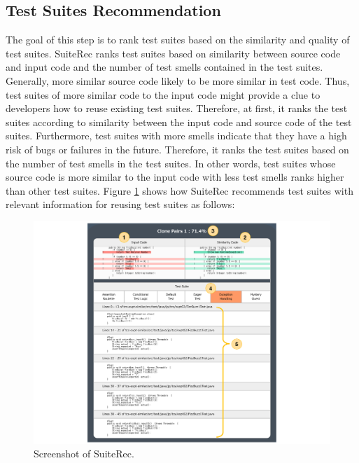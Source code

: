 \documentclass[conference]{IEEEtran}
\begin{document}
\subsection{Test Suites Recommendation}
The goal of this step is to rank test suites based on the similarity and quality of test suites. \textsf{SuiteRec} ranks test suites based on similarity between source code and input code and the number of test smells contained in the test suites. 
Generally, more similar source code likely to be more similar in test code. Thus, test suites of more similar code to the input code might provide a clue to developers how to reuse existing test suites. Therefore, at first, it ranks the test suites according to similarity between the input code and source code of the test suites. Furthermore, test suites with more smells indicate that they have a high risk of bugs or failures in the future. Therefore, it ranks the test suites based on the number of test smells in the test suites. In other words, test suites whose source code is more similar to the input code with less test smells ranks higher than other test suites. 
Figure \ref{fig:screen} shows how \textsf{SuiteRec} recommends test suites with relevant information for reusing test suites as follows:


\begin{figure}[htbp]
\centerline{\includegraphics[width=18cm]{SuiteRec.pdf}}
\caption{Screenshot of \textsf{SuiteRec}.}
\label{fig:screen}
\end{figure}
\end{document}

